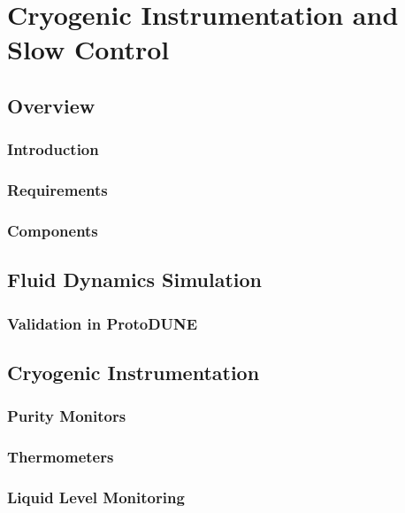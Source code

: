 \chapter{Cryogenic Instrumentation and Slow Control}
\label{ch:sp-cisc}

\section{Overview}

\subsection{Introduction}

\subsection{Requirements}

\subsection{Components}


\section{Fluid Dynamics Simulation}

\subsection{Validation in ProtoDUNE}


\section{Cryogenic Instrumentation}

\subsection{Purity Monitors}

\subsection{Thermometers}

\subsection{Liquid Level Monitoring}

